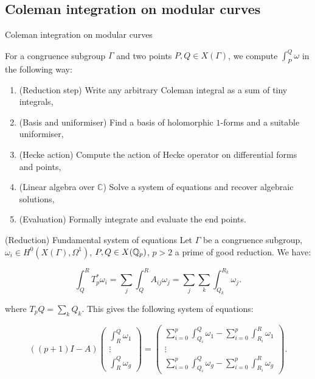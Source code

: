 \subsection{Coleman integration on modular curves}

\begin{frame}{Coleman integration on modular curves}

For a congruence subgroup $\Gamma$ and two points $P,Q \in X(\Gamma)$, we compute $\int_P^Q \omega$ in the following way:

\begin{enumerate}
\item (Reduction step) Write any arbitrary Coleman integral as a sum of tiny integrals,
\item (Basis and uniformiser) Find a basis of holomorphic $1$-forms and a suitable uniformiser,
\item (Hecke action) Compute the action of Hecke operator on differential forms and points,
\item (Linear algebra over $\mathbb{C}$) Solve a system of equations and recover algebraic solutions,
\item (Evaluation) Formally integrate and evaluate the end points.
\end{enumerate}
\end{frame}

\begin{frame}{(Reduction) Fundamental system of equations}
Let $\Gamma$ be a congruence subgroup, $\omega_i \in H^0(X(\Gamma), \Omega^1)$, $P,Q \in X(\mathbb{Q}_p)$, $p >2$ a prime of good reduction. We have:

\[
\int_Q^R T_p^* \omega_i = \sum_j \int_Q^R A_{ij} \omega_j = \sum_j \sum_k \int_{Q_k}^{R_k} \omega_j.
\]

where $T_p Q = \sum_k Q_k.$ This gives the following system of equations: 

\begin{equation*}
   ((p+1)I-A)\begin{pmatrix} \int^Q_R\omega_1 \\\vdots \\ \int^Q_R\omega_g \end{pmatrix} =  \begin{pmatrix} \sum_{i=0}^{p}\int^Q_{Q_i} \omega_1 - \sum_{i=0}^{p}\int^R_{R_i} \omega_1 \\\vdots \\ \sum_{i=0}^{p}\int^Q_{Q_i} \omega_g - \sum_{i=0}^{p}\int^R_{R_i} \omega_g \end{pmatrix}.
\end{equation*}

\end{frame}


